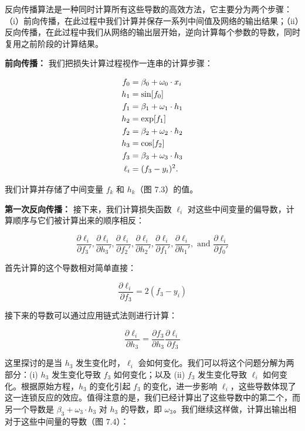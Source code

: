 反向传播算法是一种同时计算所有这些导数的高效方法，它主要分为两个步骤：（i）前向传播，在此过程中我们计算并保存一系列中间值及网络的输出结果；（ii）反向传播，在此过程中我们从网络的输出层开始，逆向计算每个参数的导数，同时复用之前阶段的计算结果。

\textbf{前向传播：} 我们把损失计算过程视作一连串的计算步骤：



\begin{align}
f_0 &= \beta_0 + \omega_0 \cdot x_i \notag \\
h_1 &= \sin[f_0] \notag \\
f_1 &= \beta_1 + \omega_1 \cdot h_1 \notag \\
h_2 &= \exp[f_1] \notag \\
f_2 &= \beta_2 + \omega_2 \cdot h_2 \notag \\
h_3 &= \cos[f_2] \notag \\
f_3 &= \beta_3 + \omega_3 \cdot h_3 \notag \\
\ell_i &= (f_3 - y_i)^2. 
\end{align} 


我们计算并存储了中间变量 \(f_k\) 和 \(h_k\)（图 7.3）的值。


\textbf{第一次反向传播：} 接下来，我们计算损失函数 \(\ell_i\) 对这些中间变量的偏导数，计算顺序与它们被计算出来的顺序相反：


\begin{equation}
\frac{\partial \ell_i}{\partial f_3'}, \frac{\partial \ell_i}{\partial h_3'}, \frac{\partial \ell_i}{\partial f_2'}, \frac{\partial \ell_i}{\partial h_2'}, \frac{\partial \ell_i}{\partial f_1'}, \frac{\partial \ell_i}{\partial h_1'}, \text{ and } \frac{\partial \ell_i}{\partial f_0'} 
\end{equation}

首先计算的这个导数相对简单直接：

\begin{equation}
\frac{\partial \ell_i}{\partial f_3} = 2(f_3 - y_i) 
\end{equation}


接下来的导数可以通过应用链式法则进行计算：

\begin{equation}
\frac{\partial \ell_i}{\partial h_3} = \frac{\partial f_3}{\partial h_3} \frac{\partial \ell_i}{\partial f_3} 
\end{equation}

这里探讨的是当 \(h_3\) 发生变化时，\(\ell_i\) 会如何变化。我们可以将这个问题分解为两部分：(i) \(h_3\) 发生变化导致 \(f_3\) 如何变化；以及 (ii) \(f_3\) 发生变化导致 \(\ell_i\) 如何变化。根据原始方程，\(h_3\) 的变化引起 \(f_3\) 的变化，进一步影响 \(\ell_i\)，这些导数体现了这一连锁反应的效应。值得注意的是，我们已经计算出了这些导数中的第二个，而另一个导数是 \(\beta_3 + \omega_3 \cdot h_3\) 对 \(h_3\) 的导数，即 \(\omega_3\)。我们继续这样做，计算出输出相对于这些中间量的导数（图 7.4）：

